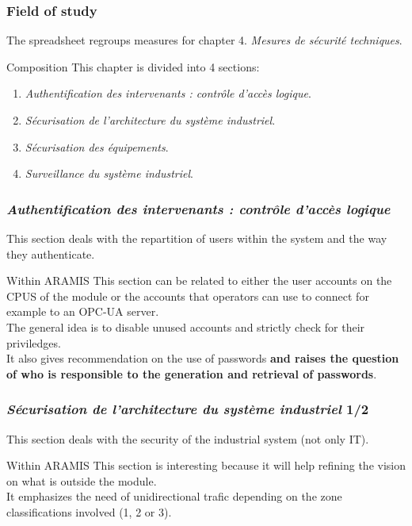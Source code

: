 \documentclass{beamer}
\begin{document}
\begin{frame}
    \frametitle{Field of study}

    The spreadsheet regroups measures for chapter 4. {\em Mesures de s\'ecurit\'e techniques}.
    \vfill
    \begin{block}{Composition}
        This chapter is divided into 4 sections:
        \begin{enumerate}
            \item {\em Authentification des intervenants : contr\^ole d'acc\`es logique}.
            \item {\em S\'ecurisation de l'architecture du syst\`eme industriel}.
            \item {\em S\'ecurisation des \'equipements}.
            \item {\em Surveillance du syst\`eme industriel}.
        \end{enumerate}
    \end{block}
\end{frame}

\begin{frame}
    \frametitle{{\em Authentification des intervenants : contr\^ole d'acc\`es logique}}

    This section deals with the repartition of users within the system and the way they authenticate.
    \vfill
    \begin{block}{Within ARAMIS}
        This section can be related to either the user accounts on the CPUS of the module or the accounts that operators can use to connect for example to an OPC-UA server.\\
        \medskip
        The general idea is to disable unused accounts and strictly check for their priviledges.\\
        It also gives recommendation on the use of passwords {\bf and raises the question of who is responsible to the generation and retrieval of passwords}.
    \end{block}
\end{frame}

\begin{frame}
    \frametitle{{\em S\'ecurisation de l'architecture du syst\`eme industriel} 1/2}

    This section deals with the security of the industrial system (not only IT).
    \vfill
    \begin{block}{Within ARAMIS}
        This section is interesting because it will help refining the vision on what is outside the module.\\
        \medskip
        It emphasizes the need of unidirectional trafic depending on the zone classifications involved (1, 2 or 3).\\
    \end{block}
\end{frame}
\end{document}
